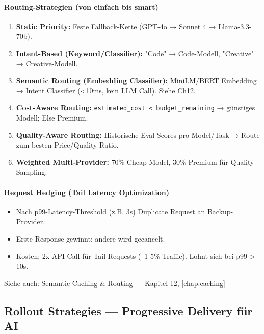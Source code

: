 \paragraph{Routing-Strategien (von einfach bis smart)}
\begin{enumerate}
    \item \textbf{Static Priority:} Feste Fallback-Kette (GPT-4o → Sonnet 4 → Llama-3.3-70b).
    \item \textbf{Intent-Based (Keyword/Classifier):} "Code" → Code-Modell, "Creative" → Creative-Modell.
    \item \textbf{Semantic Routing (Embedding Classifier):} MiniLM/BERT Embedding → Intent Classifier (<10ms, kein LLM Call). Siehe Ch12.
    \item \textbf{Cost-Aware Routing:} \texttt{estimated\_cost < budget\_remaining} → günstiges Modell; Else Premium.
    \item \textbf{Quality-Aware Routing:} Historische Eval-Scores pro Model/Task → Route zum besten Price/Quality Ratio.
    \item \textbf{Weighted Multi-Provider:} 70\% Cheap Model, 30\% Premium für Quality-Sampling.
\end{enumerate}

\paragraph{Request Hedging (Tail Latency Optimization)}
\begin{itemize}
    \item Nach p99-Latency-Threshold (z.B. 3s) Duplicate Request an Backup-Provider.
    \item Erste Response gewinnt; andere wird gecancelt.
    \item Kosten: 2x API Call für Tail Requests (~1-5\% Traffic). Lohnt sich bei p99 > 10s.
\end{itemize}

Siehe auch: Semantic Caching \& Routing — Kapitel 12, \ref{chap:caching}

\subsection{Rollout Strategies — Progressive Delivery für AI}

